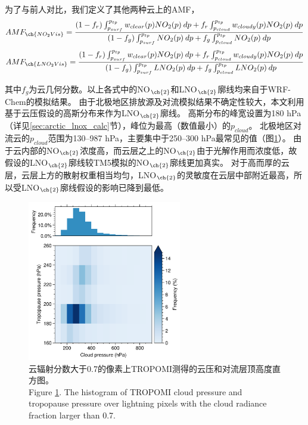 为了与前人对比，我们定义了其他两种云上的AMF，
\begin{equation} \label{eq:AMF_NO2Vis}
AMF_{\ch{NO_2Vis}} = \frac{(1-f_r) \int_{p_{surf}}^{p_{tp}} w_{clear}(p) NO_2(p) \: dp + f_r \int_{p_{cloud}}^{p_{tp}} w_{cloudy}(p) NO_2(p) \: dp}{(1-f_g) \int_{p_{surf}}^{p_{tp}} NO_2(p) \: dp + f_g \int_{p_{cloud}}^{p_{tp}} NO_2(p) \: dp}
\end{equation}
\begin{equation} \label{eq:AMF_LNO2Vis}
AMF_{\ch{LNO_2Vis}} = \frac{(1-f_r) \int_{p_{surf}}^{p_{tp}} w_{clear}(p) NO_2(p) \: dp + f_r \int_{p_{cloud}}^{p_{tp}} w_{cloudy}(p) NO_2(p) \: dp}{(1-f_g) \int_{p_{surf}}^{p_{tp}} LNO_2(p) \: dp + f_g \int_{p_{cloud}}^{p_{tp}} LNO_2(p) \: dp}
\end{equation}

其中$f_g$为云几何分数。以上各式中的NO$_{\ch{2}}$和LNO$_{\ch{2}}$廓线均来自于WRF-Chem的模拟结果。
由于北极地区排放源及对流模拟结果不确定性较大，本文利用基于云压假设的高斯分布来作为LNO$_{\ch{2}}$廓线。
高斯分布的峰宽设置为180 hPa（详见\ref{sec:arctic_lnox_calc}节），峰位为最高（数值最小）的$p_{cloud}$。
北极地区对流云的$p_{cloud}$范围为130--987 hPa，主要集中于250--300 hPa最常见的值（图\ref{fig:pcld_ptropo}）。
由于云内部的NO$_{\ch{2}}$浓度高，而云层之上的NO$_{\ch{2}}$由于光解作用而浓度低，故假设的LNO$_{\ch{2}}$廓线较TM5模拟的NO$_{\ch{2}}$廓线更加真实\citep{Beirle.2009}。
对于高而厚的云层，云层上方的散射权重相当均匀，LNO$_{\ch{2}}$的灵敏度在云层中部附近最高，所以受LNO$_{\ch{2}}$廓线假设的影响已降到最低\citep{Laughner.2017}。

\begin{figure}[H]
\centering
\includegraphics[width=0.6\textwidth]{./figures/pcld_ptropo.png}
\caption{云辐射分数大于0.7的像素上TROPOMI测得的云压和对流层顶高度直方图。\\
Figure \ref{fig:pcld_ptropo}. The histogram of TROPOMI cloud pressure and tropopause pressure over lightning
pixels with the cloud radiance fraction larger than 0.7.
}
\label{fig:pcld_ptropo}
\end{figure}

